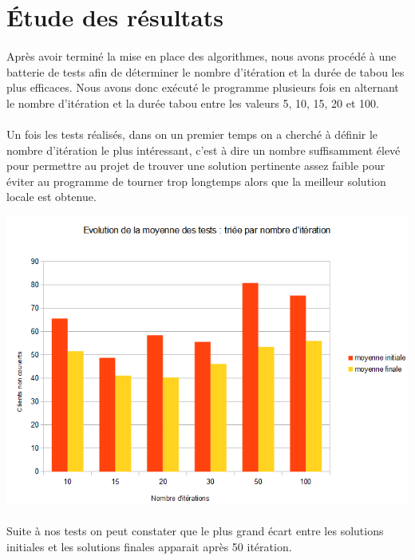\section{Étude des résultats}
    \paragraph{}Après avoir terminé la mise en place des algorithmes, nous avons procédé à une
    batterie de tests afin de déterminer le nombre d'itération et la durée de tabou les plus
    efficaces. Nous avons donc exécuté le programme plusieurs fois en alternant le nombre
    d'itération et la durée tabou entre les valeurs 5, 10, 15, 20 et 100.

    \paragraph{}Un fois les tests réalisés, dans on un premier temps on a cherché à définir le
    nombre d'itération le plus intéressant, c'est à dire un nombre suffisamment élevé pour permettre au
    projet de trouver une solution pertinente assez faible pour éviter au programme de tourner trop
    longtemps alors que la meilleur solution locale est obtenue.  
    \begin{center} \includegraphics[scale=1]{ tableau_nombre_iteration } \end{center}
    \paragraph{} Suite à nos tests on peut constater que le plus grand écart entre les solutions
    initiales et les solutions finales apparait après 50 itération.

